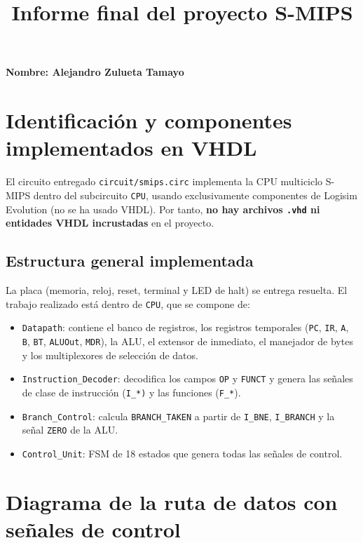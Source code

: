 \documentclass[11pt,a4paper]{article}
\title{Informe final del proyecto S-MIPS}
\author{}
\date{}
\begin{document}
\noindent \textbf{Nombre: Alejandro Zulueta Tamayo} \underline{\hspace{10cm}}\\[4mm]

\section{Identificación y componentes implementados en VHDL}

El circuito entregado \texttt{circuit/smips.circ} implementa la CPU multiciclo S-MIPS dentro del subcircuito \texttt{CPU}, usando exclusivamente componentes de Logisim Evolution (no se ha usado VHDL). Por tanto, \textbf{no hay archivos \texttt{.vhd} ni entidades VHDL incrustadas} en el proyecto.

\subsection{Estructura general implementada}

La placa (memoria, reloj, reset, terminal y LED de halt) se entrega resuelta. El trabajo realizado está dentro de \texttt{CPU}, que se compone de:

\begin{itemize}
  \item \texttt{Datapath}: contiene el banco de registros, los registros temporales (\texttt{PC}, \texttt{IR}, \texttt{A}, \texttt{B}, \texttt{BT}, \texttt{ALUOut}, \texttt{MDR}), la ALU, el extensor de inmediato, el manejador de bytes y los multiplexores de selección de datos.
  \item \texttt{Instruction\_Decoder}: decodifica los campos \texttt{OP} y \texttt{FUNCT} y genera las señales de clase de instrucción (\texttt{I\_*)} y las funciones (\texttt{F\_*}).
  \item \texttt{Branch\_Control}: calcula \texttt{BRANCH\_TAKEN} a partir de \texttt{I\_BNE}, \texttt{I\_BRANCH} y la señal \texttt{ZERO} de la ALU.
  \item \texttt{Control\_Unit}: FSM de 18 estados que genera todas las señales de control.
\end{itemize}

\section{Diagrama de la ruta de datos con señales de control}
\end{document}
